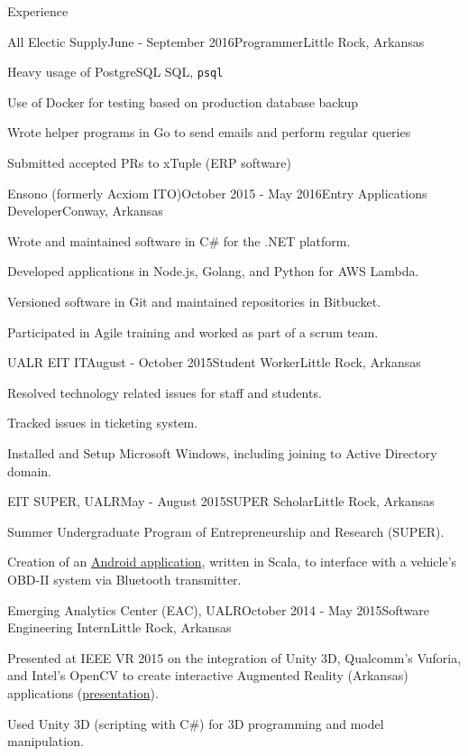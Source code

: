 \documentclass{resume} %
\begin{document}
\begin{rSection}{Experience}
\begin{rSubsection}{All Electic Supply}{June - September 2016}{Programmer}{Little Rock, Arkansas}
	\item Heavy usage of PostgreSQL SQL, {\tt psql}
	\item Use of Docker for testing based on production database backup
	\item Wrote helper programs in Go to send emails and perform regular queries
	\item Submitted accepted PRs to xTuple (ERP software)
\end{rSubsection}

\begin{rSubsection}{Ensono (formerly Acxiom ITO)}{October 2015 - May 2016}{Entry Applications Developer}{Conway, Arkansas}

	\item Wrote and maintained software in C\# for the .NET platform.
	\item Developed applications in Node.js, Golang, and Python for AWS Lambda.
	\item Versioned software in Git and maintained repositories in Bitbucket.
	\item Participated in Agile training and worked as part of a scrum team.
\end{rSubsection}

\begin{rSubsection}{UALR EIT IT}{August - October 2015}{Student Worker}{Little Rock, Arkansas}

	\item Resolved technology related issues for staff and students.
	\item Tracked issues in ticketing system.
	\item Installed and Setup Microsoft Windows, including joining to Active Directory domain.
\end{rSubsection}

\begin{rSubsection}{EIT SUPER, UALR}{May - August 2015}{SUPER Scholar}{Little Rock, Arkansas}

	\item Summer Undergraduate Program of Entrepreneurship and Research (SUPER).
	\item Creation of an \href{http://github.com/cptaffe/flamethrower}{Android application}, written in Scala, to interface with a vehicle's OBD-II system via Bluetooth transmitter.
\end{rSubsection}

\begin{rSubsection}{Emerging Analytics Center (EAC), UALR}{October 2014 - May 2015}{Software Engineering Intern}{Little Rock, Arkansas}
	\item Presented at IEEE VR 2015 on the integration of Unity 3D, Qualcomm's Vuforia, and Intel's OpenCV to create interactive Augmented Reality (Arkansas) applications (\href{http://byteflame.org/ieee_vr/}{presentation}{}).
	\item Used Unity 3D (scripting with C\#) for 3D programming and model manipulation.
\end{rSubsection}


\end{rSection}
\end{document}

